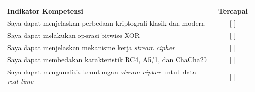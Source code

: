 \documentclass[../main.tex]{subfiles}
\begin{document}
\begin{competencychecklist}
\begin{tabularx}{\linewidth}{|X|c|}
\hline
Indikator Kompetensi & Tercapai \\
\hline
Saya dapat menjelaskan perbedaan kriptografi klasik dan modern & [ ] \\
\hline
Saya dapat melakukan operasi bitwise XOR & [ ] \\
\hline
Saya dapat menjelaskan mekanisme kerja \textit{stream cipher} & [ ] \\
\hline
Saya dapat membedakan karakteristik RC4, A5/1, dan ChaCha20 & [ ] \\
\hline
Saya dapat menganalisis keuntungan \textit{stream cipher} untuk data \textit{real-time} & [ ] \\
\hline
\end{tabularx}
\end{competencychecklist}
\end{document}
